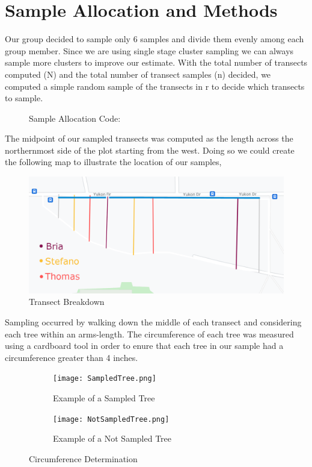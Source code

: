 \documentclass[12pt]{amsart}
\begin{document}
\section{Sample Allocation and Methods}
Our group decided to sample only 6 samples and divide them evenly among each group member. Since we are using single stage cluster sampling 
we can always sample more clusters to improve our estimate. With the total number of transects computed (N) and the total number of transect samples (n)
decided, we computed a simple random sample of the transects in r to decide which transects to sample. 
\begin{figure}[H]
    \begin{center}
        \caption{Sample Allocation Code:}
        
        \end{center} 
    \end{figure}
The midpoint of our sampled transects was computed as the length across the northernmost side of the plot starting from the west. Doing so we could create the following map to illustrate the location of our samples, 
 \begin{figure}[H]
 \begin{center}
 \caption{Transect Breakdown}
 \includegraphics[width=\linewidth]{AreaImageEdited.png}
 \end{center}
 \end{figure}
Sampling occurred by walking down the middle of each transect and considering each tree within an arms-length. The circumference of each tree was measured using a cardboard tool in order to 
enure that each tree in our sample had a circumference greater than 4 inches. 


\begin{figure}[H]
    \centering
    \begin{subfigure}[b]{0.45\textwidth}
        \centering
        \texttt{[image: SampledTree.png]}
        \caption{Example of a Sampled Tree}

    \end{subfigure}
    \hfill
    \begin{subfigure}[b]{0.45\textwidth}
        \centering
        \texttt{[image: NotSampledTree.png]}
        \caption{Example of a Not Sampled Tree}

    \end{subfigure}
       \caption{Circumference Determination}
\end{figure}
\end{document}
